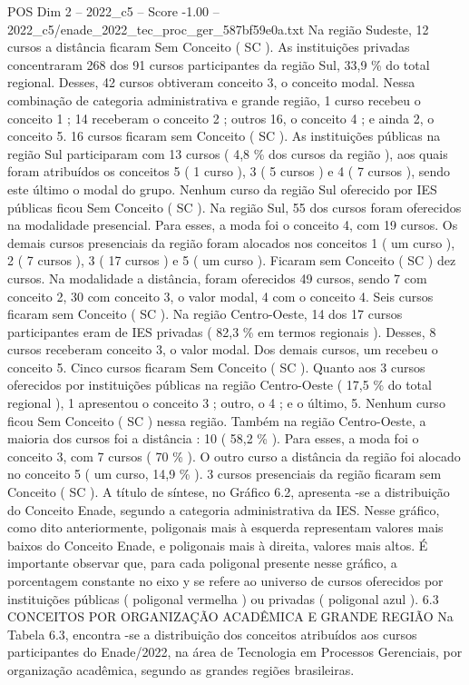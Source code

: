 \begin{textsample}{POS Dim 2 – 2022\_c5 – Score -1.00 – 2022\_c5/enade\_2022\_tec\_proc\_ger\_587bf59e0a.txt}
Na região Sudeste, 12 cursos a distância ficaram Sem Conceito ( SC ).
As instituições privadas concentraram 268 dos 91 cursos participantes da região Sul, 33,9 \% do total regional.
Desses, 42 cursos obtiveram conceito 3, o conceito modal.
Nessa combinação de categoria administrativa e grande região, 1 curso recebeu o conceito 1 ; 14 receberam o conceito 2 ; outros 16, o conceito 4 ; e ainda 2, o conceito 5. 16 cursos ficaram sem Conceito ( SC ).
As instituições públicas na região Sul participaram com 13 cursos ( 4,8 \% dos cursos da região ), aos quais foram atribuídos os conceitos 5 ( 1 curso ), 3 ( 5 cursos ) e 4 ( 7 cursos ), sendo este último o modal do grupo.
Nenhum curso da região Sul oferecido por IES públicas ficou Sem Conceito ( SC ).
Na região Sul, 55 dos cursos foram oferecidos na modalidade presencial.
Para esses, a moda foi o conceito 4, com 19 cursos.
Os demais cursos presenciais da região foram alocados nos conceitos 1 ( um curso ), 2 ( 7 cursos ), 3 ( 17 cursos ) e 5 ( um curso ).
Ficaram sem Conceito ( SC ) dez cursos.
Na modalidade a distância, foram oferecidos 49 cursos, sendo 7 com conceito 2, 30 com conceito 3, o valor modal, 4 com o conceito 4.
Seis cursos ficaram sem Conceito ( SC ).
Na região Centro-Oeste, 14 dos 17 cursos participantes eram de IES privadas ( 82,3 \% em termos regionais ).
Desses, 8 cursos receberam conceito 3, o valor modal.
Dos demais cursos, um recebeu o conceito 5.
Cinco cursos ficaram Sem Conceito ( SC ).
Quanto aos 3 cursos oferecidos por instituições públicas na região Centro-Oeste ( 17,5 \% do total regional ), 1 apresentou o conceito 3 ; outro, o 4 ; e o último, 5.
Nenhum curso ficou Sem Conceito ( SC ) nessa região.
Também na região Centro-Oeste, a maioria dos cursos foi a distância : 10 ( 58,2 \% ).
Para esses, a moda foi o conceito 3, com 7 cursos ( 70 \% ).
O outro curso a distância da região foi alocado no conceito 5 ( um curso, 14,9 \% ). 3 cursos presenciais da região ficaram sem Conceito ( SC ).
A título de síntese, no Gráfico 6.2, apresenta -se a distribuição do Conceito Enade, segundo a categoria administrativa da IES.
Nesse gráfico, como dito anteriormente, poligonais mais à esquerda representam valores mais baixos do Conceito Enade, e poligonais mais à direita, valores mais altos.
É importante observar que, para cada poligonal presente nesse gráfico, a porcentagem constante no eixo y se refere ao universo de cursos oferecidos por instituições públicas ( poligonal vermelha ) ou privadas ( poligonal azul ). 6.3 CONCEITOS POR ORGANIZAÇÃO ACADÊMICA E GRANDE REGIÃO Na Tabela 6.3, encontra -se a distribuição dos conceitos atribuídos aos cursos participantes do Enade/2022, na área de Tecnologia em Processos Gerenciais, por organização acadêmica, segundo as grandes regiões brasileiras.

\end{textsample}
